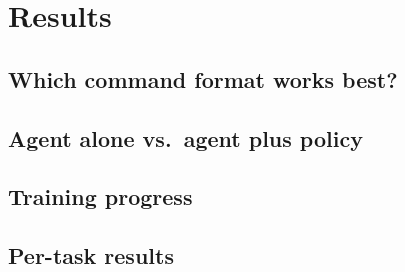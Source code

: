 \section{Results}
\label{sec:results}


\subsection{Which command format works best?}


\subsection{Agent alone vs.\ agent plus policy}


\subsection{Training progress}


\subsection{Per-task results}

